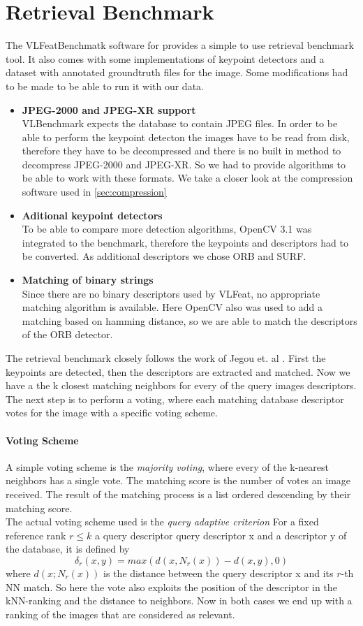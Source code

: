 \documentclass[10pt,a4paper]{article}
\begin{document}
\section{Retrieval Benchmark}
The VLFeatBenchmatk software for provides a simple to use retrieval benchmark tool. It also comes with some implementations of keypoint detectors and a dataset with annotated groundtruth files for the image. Some modifications had to be made to be able to run it with our data. 
\begin{itemize}
	\item \textbf{JPEG-2000 and JPEG-XR support}\\
VLBenchmark expects the database to contain JPEG files. In order to be able to perform the keypoint detecton the images have to be read from disk, therefore they have to be decompressed and there is no built in method to decompress JPEG-2000 and JPEG-XR. So we had to provide algorithms to be able to work with these formats. We take a closer look at the compression software used in \autoref{sec:compression}
	\item \textbf{Aditional keypoint detectors}\\
To be able to compare more detection algorithms, OpenCV 3.1 was integrated to the benchmark, therefore the keypoints and descriptors had to be converted. As additional descriptors we chose ORB and SURF.
	\item \textbf{Matching of binary strings}\\
Since there are no binary descriptors used by VLFeat, no appropriate matching algorithm is available. Here OpenCV also was used to add a matching based on hamming distance, so we are able to match the descriptors of the ORB detector.	
\end{itemize}
 The retrieval benchmark closely follows the work of Jegou et. al \autocite{inria}. First the keypoints are detected, then the descriptors are extracted and matched. Now we have a the k closest matching neighbors for every of the query images descriptors. The next step is to perform a voting, where each matching database descriptor votes for the image with a specific voting scheme.
\paragraph{Voting Scheme}
A simple voting scheme is the \textit{majority voting}, where every of the k-nearest neighbors has a single vote. The matching score is the number of votes an image received. The result of the matching process is a list ordered descending by their matching score.\\
The actual voting scheme used is the \textit{query adaptive criterion} For a fixed reference rank $r \leq k$ a query descriptor query descriptor x and a descriptor y of the database, it is defined by $$\delta_r(x,y) = max(d(x,N_r(x))-d(x,y),0)$$ where $d (x;N_r(x))$ is the distance between the query descriptor x and its $r$-th NN match. So here the vote also exploits the position of the descriptor in the kNN-ranking and the distance to neighbors. Now in both cases we end up with a ranking of the images that are considered as relevant.
\end{document}
